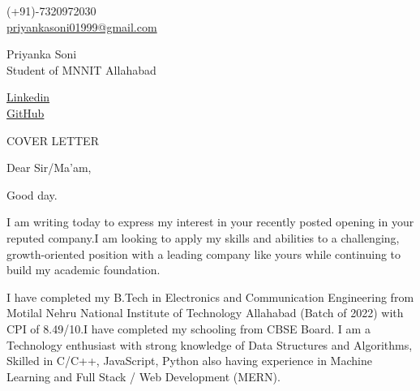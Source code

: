 \documentclass[11pt,a4]{article}
\begin{document}
\begin{center}
    \begin{minipage}[b]{0.24\textwidth}
    \large (+91)-7320972030 \\
    \large \href{mailto:priyankasoni01999@gmail.com}{priyankasoni01999@gmail.com} 
\end{minipage} 
\begin{minipage}[b]{0.5\textwidth}
            \centering
            {\Huge Priyanka Soni} \\ %
            \vspace{0.1cm}
            {\color{UI_blue} \Large{Student of MNNIT Allahabad}} \\
    \end{minipage}%
    \begin{minipage}[b]{0.24\textwidth}
            \flushright \large
            {\href{https://www.linkedin.com/in/priyanka-soni-131668176}{Linkedin} } \\
            \href{https://github.com/PSoni8}{GitHub}
    \end{minipage}   
    
\vspace{-0.15cm} 
{\color{UI_blue} \hrulefill}
\end{center}

\justify
\setlength{\parindent}{0pt}
\setlength{\parskip}{12pt}
\vspace{0.2cm}
\begin{center}
    {\color{UI_blue} \Large{COVER LETTER}}
\end{center}

Dear Sir/Ma'am,

Good day.

I am writing today to express my interest in your recently posted opening in your reputed company.I am looking to apply my skills and abilities to a challenging, growth-oriented position with a leading company like yours while continuing to build my academic foundation.\par

I have completed my B.Tech in Electronics and Communication Engineering from Motilal Nehru National Institute of Technology Allahabad (Batch of 2022) with CPI of 8.49/10.I have completed my schooling from CBSE Board. I am a Technology enthusiast with strong knowledge of Data Structures and Algorithms, Skilled in C/C++, JavaScript, Python also having experience in Machine Learning and Full Stack / Web Development (MERN).\par
\end{document}
